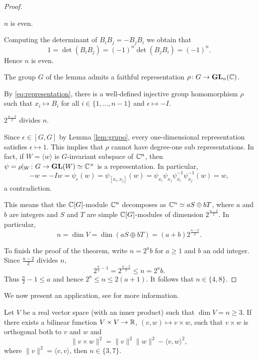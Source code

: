 \begin{proof}
    \begin{claim}
        $n$ is even. 
    \end{claim}
    
	Computing the determinant of 
	$B_iB_j=-B_jB_i$ we obtain that 
	\[
	1=\det(B_iB_j)=(-1)^n\det(B_jB_i)=(-1)^n.
	\]
	Hence $n$ is even. 

	\begin{claim}
	    The group 
	    $G$ of the lemma admits a faithful
	    representation $\rho\colon G\to\mathbf{GL}_n(\mathbb{C})$. 
	\end{claim}
	
	By \eqref{eq:representation}, there is a well-defined 
	injective group homomorphism $\rho$ such that 
	$x_i\mapsto B_i$ for all $i\in\{1,\dots,n-1\}$ and 
	$\epsilon\mapsto -I$. 
	
	\begin{claim}
	    $2^{\frac{n-2}{2}}$ divides $n$.
	\end{claim}
	
	Since $\epsilon\in[G,G]$ by Lemma \ref{lem:grupo}, 
	every one-dimensional representation satisfies $\epsilon\mapsto 1$.
	This implies that $\rho$ cannot have degree-one sub representations. 
	In fact, 
	if $W=\langle w\rangle$ is $G$-invariant subspace of $\mathbb{C}^n$, 
	then $\psi=\rho|_W\colon G\to\mathbf{GL}(W)\simeq\mathbb{C}^\times$ 
	is a representation. In particular, 
	\[
	-w=-Iw=\psi_{\epsilon}(w)=\psi_{[x_i,x_j]}(w)
	=\psi_{x_i}\psi_{x_j}\psi_{{x_i}}^{-1}\psi_{{x_j}}^{-1}(w)=w, 
	\]
	a contradiction. 
	
	This means that the $\mathbb{C}[G]$-module $\mathbb{C}^n$ 
	decomposes as $\mathbb{C}^n\simeq aS\oplus bT$,
	where $a$ and $b$ are integers and 
	$S$ and $T$ are simple $\mathbb{C}[G]$-modules of dimension
	$2^{\frac{n-2}{2}}$. In particular, 
	\[
	n=\dim V=\dim(aS\oplus bT)=(a+b)2^{\frac{n-2}{2}}.
	\]
	
	To finish the proof of the theorem, write $n=2^ab$ 
	for $a\geq1$ and $b$ an odd integer. 
	Since $\frac{n-2}{2}$ divides $n$, 
	\[
	2^{\frac{n}{2}-1}=2^{\frac{n-2}{2}}\leq n=2^ab. 
	\]
	Thus $\frac{n}{2}-1\leq a$ and hence $2^a\leq n\leq 2(a+1)$. 
	It follows that $n\in\{4,8\}$.  
\end{proof}

We now present an application, see
\cite{MR1534187} for more information. 

\begin{theorem}
	Let $V$ be a real vector space (with an inner product) 
	such that $\dim
	V=n\geq3$. If there exists a bilinear function 
	$V\times V\to\mathbb{R}$, $(v,w)\mapsto v\times
	w$, such that $v\times w$ is orthogonal both 
	to $v$ and $w$ and 
	\[
		\|v\times w\|^2=\|v\|^2\|w\|^2-\langle v,w\rangle^2,
	\]
	where $\|v\|^2=\langle v,v\rangle$, then $n\in\{3,7\}$. 
\end{theorem}

